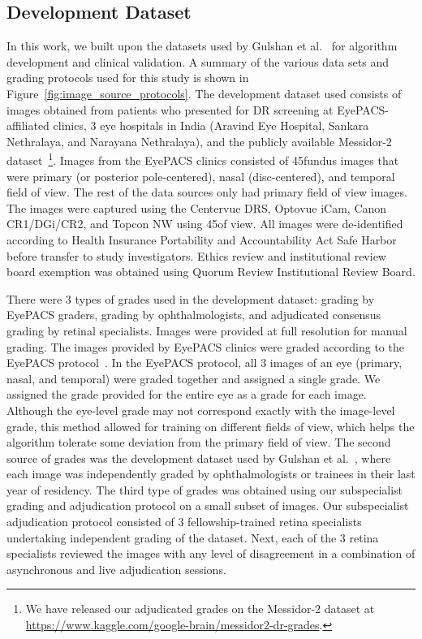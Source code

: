 \documentclass{llncs}
\begin{document}
\subsection{Development Dataset}
In this work, we built upon the datasets used by Gulshan et al.~\cite{gulshan2016development} for algorithm development and clinical validation. A summary of the various data sets and grading protocols used for this study is shown in Figure~\ref{fig:image_source_protocols}. The development dataset used consists of images obtained from patients who presented for DR screening at EyePACS-affiliated clinics, 3 eye hospitals in India (Aravind Eye Hospital, Sankara Nethralaya, and Narayana Nethralaya), and the publicly available Messidor-2 dataset~\cite{decenciere2014feedback,quellec2008optimal}\footnote{We have released our adjudicated grades on the Messidor-2 dataset at \url{https://www.kaggle.com/google-brain/messidor2-dr-grades}.}. Images from the EyePACS clinics consisted of 45\textdegree\retinal fundus images that were primary (or posterior pole-centered), nasal (disc-centered), and temporal field of view. The rest of the data sources only had primary field of view images. The images were captured using the Centervue DRS, Optovue iCam, Canon CR1/DGi/CR2, and Topcon NW using 45\textdegree\fields of view. All images were de-identified according to Health Insurance Portability and Accountability Act Safe Harbor before transfer to study investigators.  Ethics review and institutional review board exemption was obtained using Quorum Review Institutional Review Board.

There were 3 types of grades used in the development dataset: grading by EyePACS graders, grading by ophthalmologists, and adjudicated consensus grading by retinal specialists. Images were provided at full resolution for manual grading. The images provided by EyePACS clinics were graded according to the EyePACS protocol~\cite{eyepacs}. In the EyePACS protocol, all 3 images of an eye (primary, nasal, and temporal) were graded together and assigned a single grade. We assigned the grade provided for the entire eye as a grade for each image. Although the eye-level grade may not correspond exactly with the image-level grade, this method allowed for training on different fields of view, which helps the algorithm tolerate some deviation from the primary field of view.  The second source of grades was the development dataset used by Gulshan et al.~\cite{gulshan2016development}, where each image was independently graded by ophthalmologists or trainees in their last year of residency. The third type of grades was obtained using our subspecialist grading and adjudication protocol on a small subset of images. Our subspecialist adjudication protocol consisted of 3 fellowship-trained retina specialists undertaking independent grading of the dataset. Next, each of the 3 retina specialists reviewed the images with any level of disagreement in a combination of asynchronous and live adjudication sessions.
\end{document}
